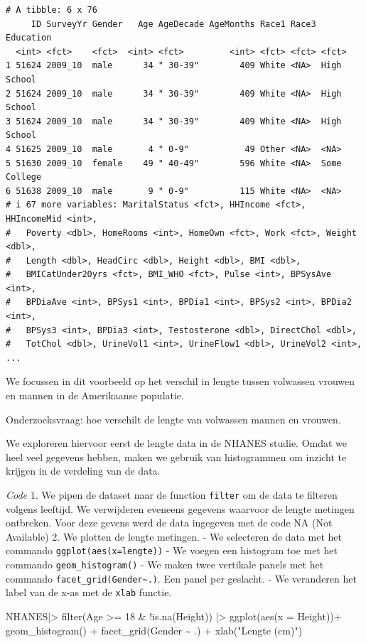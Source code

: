 \documentclass[
  dutch,
  letterpaper,
  12pt]{book}
\newenvironment{Shaded}{\begin{snugshade}}{\end{snugshade}}
\newcommand{\AttributeTok}[1]{\textcolor[rgb]{0.40,0.45,0.13}{#1}}
\newcommand{\DecValTok}[1]{\textcolor[rgb]{0.68,0.00,0.00}{#1}}
\newcommand{\FunctionTok}[1]{\textcolor[rgb]{0.28,0.35,0.67}{#1}}
\newcommand{\NormalTok}[1]{\textcolor[rgb]{0.00,0.23,0.31}{#1}}
\newcommand{\SpecialCharTok}[1]{\textcolor[rgb]{0.37,0.37,0.37}{#1}}
\newcommand{\StringTok}[1]{\textcolor[rgb]{0.13,0.47,0.30}{#1}}
\theoremstyle{definition}
\theoremstyle{definition}
\theoremstyle{definition}
\theoremstyle{remark}
\begin{document}
\begin{verbatim}
# A tibble: 6 x 76
     ID SurveyYr Gender   Age AgeDecade AgeMonths Race1 Race3 Education   
  <int> <fct>    <fct>  <int> <fct>         <int> <fct> <fct> <fct>       
1 51624 2009_10  male      34 " 30-39"        409 White <NA>  High School 
2 51624 2009_10  male      34 " 30-39"        409 White <NA>  High School 
3 51624 2009_10  male      34 " 30-39"        409 White <NA>  High School 
4 51625 2009_10  male       4 " 0-9"           49 Other <NA>  <NA>        
5 51630 2009_10  female    49 " 40-49"        596 White <NA>  Some College
6 51638 2009_10  male       9 " 0-9"          115 White <NA>  <NA>        
# i 67 more variables: MaritalStatus <fct>, HHIncome <fct>, HHIncomeMid <int>,
#   Poverty <dbl>, HomeRooms <int>, HomeOwn <fct>, Work <fct>, Weight <dbl>,
#   Length <dbl>, HeadCirc <dbl>, Height <dbl>, BMI <dbl>,
#   BMICatUnder20yrs <fct>, BMI_WHO <fct>, Pulse <int>, BPSysAve <int>,
#   BPDiaAve <int>, BPSys1 <int>, BPDia1 <int>, BPSys2 <int>, BPDia2 <int>,
#   BPSys3 <int>, BPDia3 <int>, Testosterone <dbl>, DirectChol <dbl>,
#   TotChol <dbl>, UrineVol1 <int>, UrineFlow1 <dbl>, UrineVol2 <int>, ...
\end{verbatim}

We focussen in dit voorbeeld op het verschil in lengte tussen volwassen
vrouwen en mannen in de Amerikaanse populatie.

Onderzoeksvraag: hoe verschilt de lengte van volwassen mannen en
vrouwen.

We exploreren hiervoor eerst de lengte data in de NHANES studie. Omdat
we heel veel gegevens hebben, maken we gebruik van histogrammen om
inzicht te krijgen in de verdeling van de data.

\emph{Code} 1. We pipen de dataset naar de function \texttt{filter} om
de data te filteren volgens leeftijd. We verwijderen eveneens gegevens
waarvoor de lengte metingen ontbreken. Voor deze gevens werd de data
ingegeven met de code NA (Not Available) 2. We plotten de lengte
metingen. - We selecteren de data met het commando
\texttt{ggplot(aes(x=lengte))} - We voegen een histogram toe met het
commando \texttt{geom\_histogram()} - We maken twee vertikale panels met
het commando \texttt{facet\_grid(Gender\textasciitilde{}.)}. Een panel
per geslacht. - We veranderen het label van de x-as met de \texttt{xlab}
functie.

\begin{Shaded}
\begin{Highlighting}[]
\NormalTok{NHANES}\SpecialCharTok{|\textgreater{}}  
  \FunctionTok{filter}\NormalTok{(Age }\SpecialCharTok{\textgreater{}=} \DecValTok{18} \SpecialCharTok{\&} \SpecialCharTok{!}\FunctionTok{is.na}\NormalTok{(Height)) }\SpecialCharTok{|\textgreater{}}
  \FunctionTok{ggplot}\NormalTok{(}\FunctionTok{aes}\NormalTok{(}\AttributeTok{x =}\NormalTok{ Height))}\SpecialCharTok{+}
  \FunctionTok{geom\_histogram}\NormalTok{() }\SpecialCharTok{+}
  \FunctionTok{facet\_grid}\NormalTok{(Gender }\SpecialCharTok{\textasciitilde{}}\NormalTok{ .) }\SpecialCharTok{+}
  \FunctionTok{xlab}\NormalTok{(}\StringTok{"Lengte (cm)"}\NormalTok{)}
\end{Highlighting}
\end{Shaded}
\end{document}
